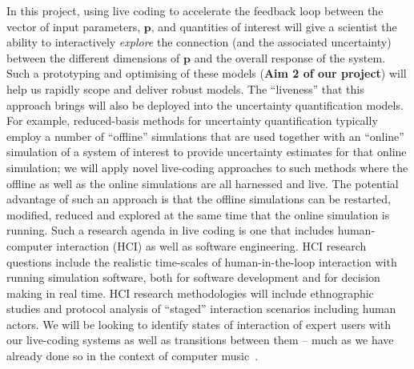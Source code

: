 In this project, using live coding to accelerate the feedback loop between the vector of input parameters,
$\mathbf{p}$,  and quantities of interest  will give a scientist the ability to interactively
\emph{explore} the connection (and the associated uncertainty) between
the different dimensions of $\mathbf{p}$ and the overall response of
the system. Such a prototyping and optimising of these models ({\bf Aim 2 of our project}) will help us rapidly scope and deliver 
robust models. The ``liveness'' that this approach brings will also be deployed 
into the uncertainty quantification models. For example, reduced-basis methods for uncertainty 
quantification typically employ a number of ``offline'' simulations that are used together with an ``online'' simulation of 
a system of interest to provide uncertainty estimates for that online simulation; we will apply novel live-coding
approaches to such methods where the offline as well as the online simulations are all harnessed and live. The 
potential advantage of such an approach is that the offline simulations can be restarted, modified, reduced and 
explored at the same time that the online simulation is running. Such a research agenda in live coding is one that 
includes human-computer interaction (HCI) as well as software engineering. HCI research questions include the realistic time-scales of 
human-in-the-loop interaction with running simulation software, both for software development and for decision making in real time.
HCI research methodologies will include ethnographic studies and protocol analysis of ``staged'' interaction scenarios including
human actors. We will be looking to identify states of interaction 
of expert users with our live-coding systems as well as transitions between them -- much as we have already done so in the 
context of computer music~\parencite{swift2014coding}.







